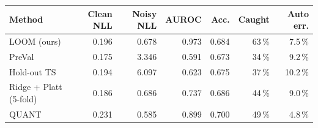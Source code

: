 \begin{tabular}{lrrrrrr}
\toprule
Method & Clean NLL & Noisy NLL & AUROC & Acc. & Caught & Auto err. \\
\midrule
LOOM (ours) & 0.196 & 0.678 & 0.973 & 0.684 & 63\,\% & 7.5\,\% \\
PreVal & 0.175 & 3.346 & 0.591 & 0.673 & 34\,\% & 9.2\,\% \\
Hold-out TS & 0.194 & 6.097 & 0.623 & 0.675 & 37\,\% & 10.2\,\% \\
Ridge + Platt (5-fold) & 0.186 & 0.686 & 0.737 & 0.686 & 44\,\% & 9.0\,\% \\
QUANT & 0.231 & 0.585 & 0.899 & 0.700 & 49\,\% & 4.8\,\% \\
\bottomrule
\end{tabular}
